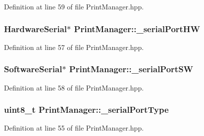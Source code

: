 Definition at line 59 of file Print\+Manager.\+hpp.

\subsubsection[{\texorpdfstring{\+\_\+serial\+Port\+HW}{_serialPortHW}}]{\setlength{\rightskip}{0pt plus 5cm}Hardware\+Serial$\ast$ Print\+Manager\+::\+\_\+serial\+Port\+HW\hspace{0.3cm}{\ttfamily [protected]}}\hypertarget{class_print_manager_a19cd58c07357e6142b92ed4598cda1bc}{}\label{class_print_manager_a19cd58c07357e6142b92ed4598cda1bc}


Definition at line 57 of file Print\+Manager.\+hpp.

\subsubsection[{\texorpdfstring{\+\_\+serial\+Port\+SW}{_serialPortSW}}]{\setlength{\rightskip}{0pt plus 5cm}Software\+Serial$\ast$ Print\+Manager\+::\+\_\+serial\+Port\+SW\hspace{0.3cm}{\ttfamily [protected]}}\hypertarget{class_print_manager_aa079f14838d51ffd18ac814323c3d177}{}\label{class_print_manager_aa079f14838d51ffd18ac814323c3d177}


Definition at line 58 of file Print\+Manager.\+hpp.

\subsubsection[{\texorpdfstring{\+\_\+serial\+Port\+Type}{_serialPortType}}]{\setlength{\rightskip}{0pt plus 5cm}uint8\+\_\+t Print\+Manager\+::\+\_\+serial\+Port\+Type\hspace{0.3cm}{\ttfamily [protected]}}\hypertarget{class_print_manager_ae1b8f767b738748027e0ac2a97f1be6c}{}\label{class_print_manager_ae1b8f767b738748027e0ac2a97f1be6c}


Definition at line 55 of file Print\+Manager.\+hpp.

